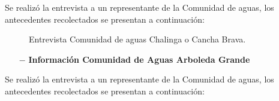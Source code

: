 \documentclass[]{article}
\begin{document}
Se realizó la entrevista a un representante de la Comunidad de aguas, los antecedentes recolectados se presentan a continuación:

\begin{figure} [H]
	\caption{Entrevista Comunidad de aguas Chalinga o Cancha Brava.}
\end{figure}
\clearpage
\begin{itemize}
	\item[$-$] \textbf{Información Comunidad de Aguas Arboleda Grande}
\end{itemize}

Se realizó la entrevista a un representante de la Comunidad de aguas, los antecedentes recolectados se presentan a continuación:
\end{document}
